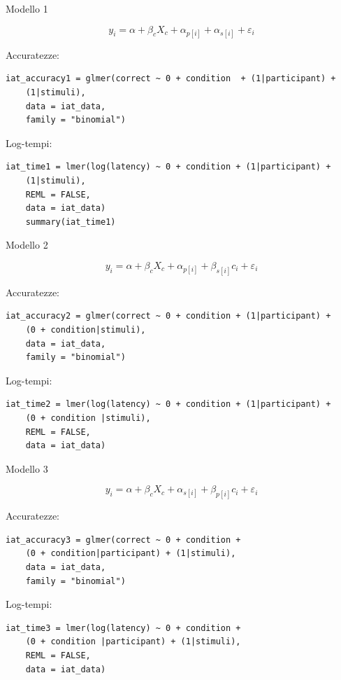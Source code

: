\documentclass[compress]{beamer}
\begin{document}
\begin{frame}[fragile]{Modello 1}

	\begin{equation*}
	y_{i} = {\alpha + \beta_c X_c}  + {\alpha_{p[i]} +  \alpha_{s[i]} + \varepsilon_{i}}
\end{equation*}

Accuratezze: 

\begin{lstlisting}
iat_accuracy1 = glmer(correct ~ 0 + condition  + (1|participant) + 
	(1|stimuli),
	data = iat_data,
	family = "binomial")
\end{lstlisting}

Log-tempi:


\begin{lstlisting}
iat_time1 = lmer(log(latency) ~ 0 + condition + (1|participant) + 
	(1|stimuli),
	REML = FALSE,
	data = iat_data)
	summary(iat_time1)
\end{lstlisting}

\end{frame}

\begin{frame}[fragile]{Modello 2}
	
	\begin{equation*}
	y_{i} = {\alpha + \beta_c X_c}  + { \alpha_{p[i]} +  \beta_{s[i]}c_{i} + \varepsilon_{i}}
	\end{equation*}
	
	Accuratezze: 
	
	\begin{lstlisting}
iat_accuracy2 = glmer(correct ~ 0 + condition + (1|participant) + 
	(0 + condition|stimuli),
	data = iat_data,
	family = "binomial")
	\end{lstlisting}
	
	Log-tempi:
	
	
	\begin{lstlisting}
iat_time2 = lmer(log(latency) ~ 0 + condition + (1|participant) + 
	(0 + condition |stimuli),
	REML = FALSE,
	data = iat_data)
	\end{lstlisting}
	
\end{frame}
%
%
\begin{frame}[fragile]{Modello 3}
	
	\begin{equation*}
	y_{i} = {\alpha + \beta_c X_c}  + {\alpha_{s[i]} +  \beta_{p[i]}c_{i} + \varepsilon_{i}}
	\end{equation*}
	
	Accuratezze: 
	
	\begin{lstlisting}
iat_accuracy3 = glmer(correct ~ 0 + condition + 
	(0 + condition|participant) + (1|stimuli),
	data = iat_data,
	family = "binomial")
	\end{lstlisting}
	
	Log-tempi:
	
	
	\begin{lstlisting}
iat_time3 = lmer(log(latency) ~ 0 + condition + 
	(0 + condition |participant) + (1|stimuli),
	REML = FALSE,
	data = iat_data)
	\end{lstlisting}
	
\end{frame}
\end{document}
